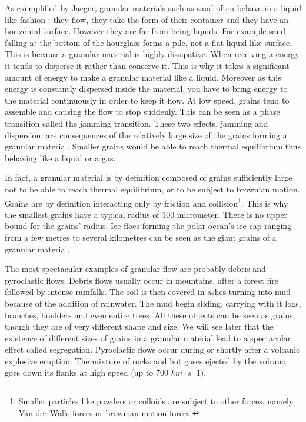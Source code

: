 \documentclass[11pt,a4paper]{report}
\begin{document}
As exemplified by Jaeger, granular materials such as sand often behave in a liquid like fashion : they flow, they take the form of their container and they have an horizontal surface. However they are far from being liquids. For example sand falling at the bottom of the hourglass forms a pile, not a flat liquid-like surface.
This is because a granular material is highly dissipative. When receiving a energy it tends to disperse it rather than conserve it. This is why it takes a significant amount of energy to make a granular material like a liquid. Moreover as this energy is constantly dispersed inside the material, you have to bring energy to the material continuously in order to keep it flow. 
At low speed, grains tend to assemble and causing the flow to stop suddenly. This can be seen as a phase transition called the jamming transition.
These two effects, jamming and dispersion, are consequences of the relatively large size of the grains forming a granular material. Smaller grains would be able to reach thermal equilibrium thus behaving like a liquid or a gas.

In fact, a granular material is by definition composed of grains sufficiently large not to be able to reach thermal equilibrium, or to be subject to brownian motion. Grains are by definition interacting only by friction and collision\footnote{Smaller particles like powders or colloids are subject to other forces, namely Van der Walls forces or brownian motion forces.}.
This is why the smallest grains have a typical radius of $100$ micrometer.
There is no upper bound for the grains' radius. Ice floes forming the polar ocean's ice cap ranging from a few metres to several kilometres can be seen as the giant grains of a granular material.

The most spectacular examples of granular flow are probably debris and pyroclastic flows.
Debris flows usually occur in mountains, after a forest fire followed by intense rainfalls. The soil is then covered in ashes turning into mud because of the addition of rainwater. The mud begin sliding, carrying with it logs, branches, boulders and even entire trees. All these objects can be seen as grains, though they are of very different shape and size. We will see later that the existence of different sizes of grains in a granular material lead to a spectacular effect called segregation.
Pyroclastic flows occur during or shortly after a volcanic explosive eruption. The mixture of rocks and hot gases ejected by the volcano goes down its flanks at high speed (up to 700 $km \cdot s^-1$).
\end{document}
